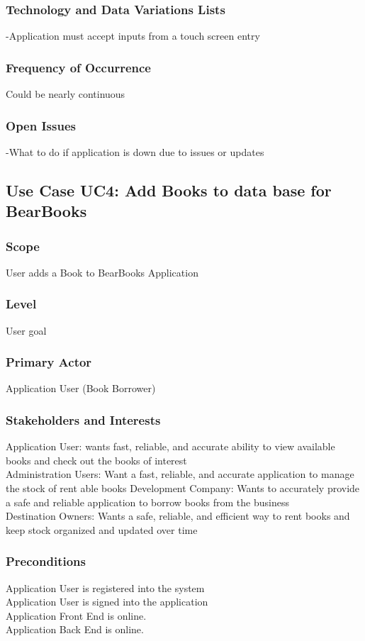 \documentclass{article}
\begin{document}
	\subsubsection{\textbf{Technology and Data Variations Lists}}
	-Application must accept inputs from a touch screen entry
	\subsubsection{\textbf{Frequency of Occurrence}}
	Could be nearly continuous
	\subsubsection{\textbf{Open Issues}}
	-What to do if application is down due to issues or updates
	
	\subsection{Use Case UC4: Add Books to data base for BearBooks}
	
	\subsubsection{\textbf{Scope}} 
	User adds a Book to BearBooks Application
	\subsubsection{\textbf{Level}} 
	User goal
	\subsubsection{\textbf{Primary Actor}} 
	Application User (Book Borrower)
	\subsubsection{\textbf{Stakeholders and Interests}}
	Application User: wants fast, reliable, and accurate ability to view available books and check out the books of interest \\
	Administration Users: Want a fast, reliable, and accurate application to manage the stock of rent able books
	Development Company: Wants to accurately provide a safe and reliable application to borrow books from the business \\
	Destination Owners: Wants a safe, reliable, and efficient way to rent books and keep stock organized and updated over time \\
	\subsubsection{\textbf{Preconditions}}
	Application User is registered into the system \\
	Application User is signed into the application \\
	Application Front End is online. \\
	Application Back End is online. \\
	
\end{document}
